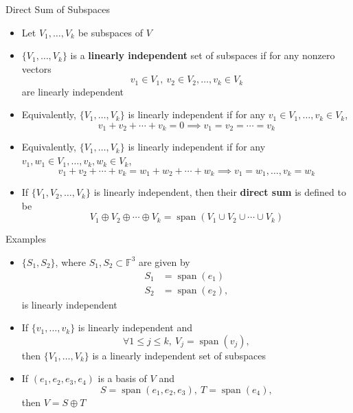 \documentclass[usenames,dvipsnames,10pt]{beamer}
\newcommand\F{\mathbb{F}}
\begin{document}
\begin{frame}
  {Direct Sum of Subspaces}

  \begin{itemize}
  \item Let $V_1, \dots, V_k$ be subspaces of $V$
  \item $\{ V_1, \dots, V_k \}$ is a {\bf linearly independent} set of subspaces if for any nonzero vectors
    \[ v_1 \in V_1,\ v_2 \in V_2, \dots, v_k \in V_k \]
    are linearly independent
  \item Equivalently, $\{ V_1, \dots, V_k \}$ is linearly independent if for any $v_1 \in V_1,\dots, v_k\in V_k$,
    \[
      v_1 + v_2 + \cdots + v_k = 0 \implies v_1 = v_2 = \cdots = v_k
    \]
  \item Equivalently,  $\{ V_1, \dots, V_k \}$ is linearly independent if for any $v_1,w_1 \in V_1,\dots, v_k,w_k\in V_k$,
    \[
      v_1+v_2+\cdots+v_k=w_1+w_2+\cdots+w_k\implies v_1=w_1, \dots, v_k=w_k
    \]
  \item If $\{V_1, V_2, \dots, V_k\}$ is linearly independent, then their {\bf direct sum} is defined to be
    \[
      V_1\oplus V_2 \oplus \cdots \oplus V_k = \operatorname{span}(V_1\cup V_2\cup\cdots\cup V_k)
    \]
  \end{itemize}
\end{frame}

\begin{frame}
  {Examples}

  \begin{itemize}
  \item $\{S_1, S_2\}$, where $S_1,S_2 \subset \F^3$ are given by
    \begin{align*}
      S_1 &= \operatorname{span}(e_1)\\
      S_2 &= \operatorname{span}(e_2),
    \end{align*}
    is linearly independent
  \item If $\{ v_1, \dots, v_k\}$ is linearly independent and
    \[ \forall 1 \le j \le k,\ V_j = \operatorname{span}(v_j), \]
    then $\{V_1, \dots, V_k\}$ is a linearly independent set of subspaces
  \item If $(e_1,e_2,e_3,e_4)$ is a basis of $V$ and
    \[ S = \operatorname{span}(e_1,e_2,e_3),\ T = \operatorname{span}(e_4), \]
    then $V = S\oplus T$
  \end{itemize}
\end{frame}
\end{document}
